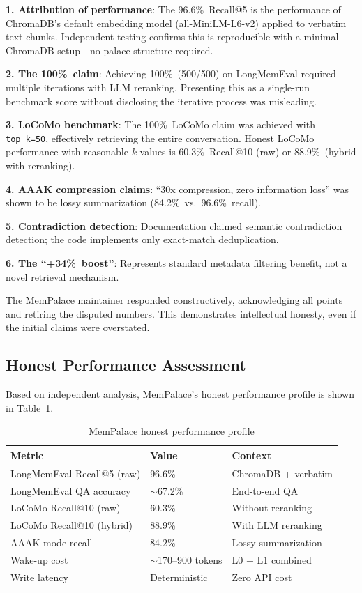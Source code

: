 \documentclass[twoside,11pt]{article}
\begin{document}
\textbf{1. Attribution of performance}: The 96.6\%\ Recall@5 is the
performance of ChromaDB's default embedding model (all-MiniLM-L6-v2) applied
to verbatim text chunks.  Independent testing confirms this is reproducible
with a minimal ChromaDB setup---no palace structure required.

\textbf{2. The 100\%\ claim}: Achieving 100\%\ (500/500) on LongMemEval
required multiple iterations with LLM reranking.  Presenting this as a
single-run benchmark score without disclosing the iterative process was
misleading.

\textbf{3. LoCoMo benchmark}: The 100\%\ LoCoMo claim was achieved with
\texttt{top\_k=50}, effectively retrieving the entire conversation.  Honest
LoCoMo performance with reasonable $k$ values is 60.3\%\ Recall@10 (raw) or
88.9\%\ (hybrid with reranking).

\textbf{4. AAAK compression claims}: ``30x compression, zero information
loss'' was shown to be lossy summarization (84.2\%\ vs.\ 96.6\%\ recall).

\textbf{5. Contradiction detection}: Documentation claimed semantic
contradiction detection; the code implements only exact-match deduplication.

\textbf{6. The ``+34\%\ boost''}: Represents standard metadata filtering
benefit, not a novel retrieval mechanism.

The MemPalace maintainer responded constructively, acknowledging all points
and retiring the disputed numbers.  This demonstrates intellectual honesty,
even if the initial claims were overstated.

\subsection{Honest Performance Assessment}

Based on independent analysis, MemPalace's honest performance profile is
shown in Table~\ref{tab:honest-perf}.

\begin{table}[t]
\centering
\caption{MemPalace honest performance profile}
\label{tab:honest-perf}
\begin{tabular}{@{}lll@{}}
\toprule
\textbf{Metric} & \textbf{Value} & \textbf{Context} \\
\midrule
LongMemEval Recall@5 (raw)   & 96.6\%  & ChromaDB + verbatim \\
LongMemEval QA accuracy      & $\sim$67.2\% & End-to-end QA \\
LoCoMo Recall@10 (raw)       & 60.3\%  & Without reranking \\
LoCoMo Recall@10 (hybrid)    & 88.9\%  & With LLM reranking \\
AAAK mode recall             & 84.2\%  & Lossy summarization \\
Wake-up cost                 & $\sim$170--900 tokens & L0 + L1 combined \\
Write latency                & Deterministic & Zero API cost \\
\bottomrule
\end{tabular}
\end{table}
\end{document}

